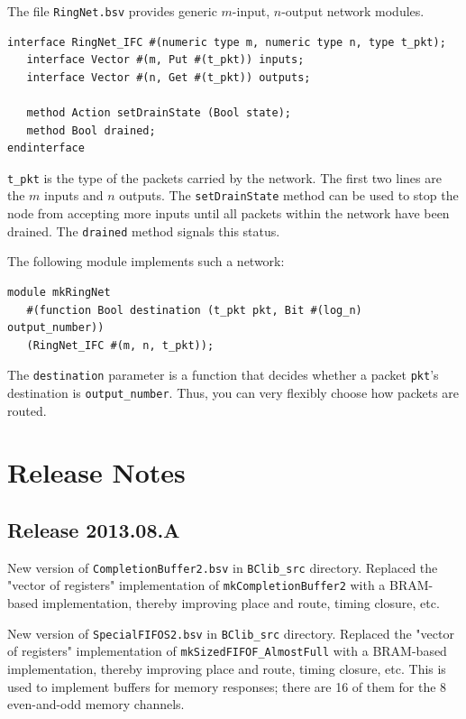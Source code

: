 \documentclass[twoside,letterpaper,11pt]{article}
\begin{document}
The file \verb|RingNet.bsv| provides generic $m$-input, $n$-output
network modules.

\begin{Verbatim}[frame=single, label=RingNet.bsv]
interface RingNet_IFC #(numeric type m, numeric type n, type t_pkt);
   interface Vector #(m, Put #(t_pkt)) inputs;
   interface Vector #(n, Get #(t_pkt)) outputs;

   method Action setDrainState (Bool state);
   method Bool drained;
endinterface
\end{Verbatim}
\verb|t_pkt| is the type of the packets carried by the network.
The first two lines are the $m$ inputs and $n$ outputs.  The
\verb|setDrainState| method can be used to stop the node from
accepting more inputs until all packets within the network have been
drained.  The \verb|drained| method signals this status.

The following module implements such a network:
\begin{Verbatim}[frame=single, label=RingNet.bsv]
module mkRingNet
   #(function Bool destination (t_pkt pkt, Bit #(log_n) output_number))
   (RingNet_IFC #(m, n, t_pkt));
\end{Verbatim}
The \verb|destination| parameter is a function that decides whether a
packet \verb|pkt|'s destination is \verb|output_number|.  Thus, you
can very flexibly choose how packets are routed.


\section{Release Notes}


\subsection {Release 2013.08.A}

New version of \verb|CompletionBuffer2.bsv| in \verb|BClib_src|
directory.  Replaced the "vector of registers" implementation of
\verb|mkCompletionBuffer2| with a BRAM-based implementation, thereby
improving place and route, timing closure, etc.

New version of \verb|SpecialFIFOS2.bsv| in \verb|BClib_src| directory.
Replaced the "vector of registers" implementation of
\verb|mkSizedFIFOF_AlmostFull| with a BRAM-based implementation,
thereby improving place and route, timing closure, etc.  This is used
to implement buffers for memory responses; there are 16 of them for
the 8 even-and-odd memory channels.


\newpage




\end{document}
